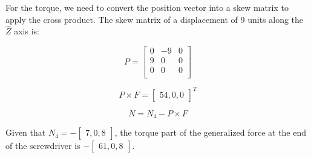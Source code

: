 \documentclass{exam}
\begin{document}
\begin{questions}
\begin{parts}
For the torque, we need to convert the position vector into a skew matrix to apply the cross product. The skew matrix of a displacement of 9 units along the $\hat Z$ axis is:

\begin{equation}
  P = \begin{bmatrix}
    0 & -9 & 0 \\
    9 & 0  & 0 \\
    0 & 0  & 0 \\
      \end{bmatrix}
\end{equation}

\begin{equation}
  P \times F = \begin{bmatrix}54, 0, 0\end{bmatrix}^T  
\end{equation}

\begin{equation}
  N = N_{4} - P \times F
\end{equation}

Given that $N_{4} = -\begin{bmatrix}7, 0, 8\end{bmatrix}$, the torque part of the generalized force at the end of the screwdriver is $-\begin{bmatrix}61, 0, 8\end{bmatrix}$.

\end{parts}

\question

\end{questions}
\end{document}
